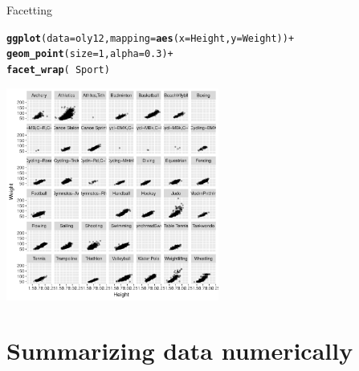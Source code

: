 \documentclass[10pt]{beamer}\usepackage[]{graphicx}\usepackage[]{color}
\makeatletter
\newcommand{\hlnum}[1]{\textcolor[rgb]{0.686,0.059,0.569}{#1}}%
\newcommand{\hlopt}[1]{\textcolor[rgb]{0,0,0}{#1}}%
\newcommand{\hlstd}[1]{\textcolor[rgb]{0.345,0.345,0.345}{#1}}%
\newcommand{\hlkwc}[1]{\textcolor[rgb]{0.333,0.667,0.333}{#1}}%
\newcommand{\hlkwd}[1]{\textcolor[rgb]{0.737,0.353,0.396}{\textbf{#1}}}%
\newenvironment{kframe}{%
 \def\at@end@of@kframe{}%
 \ifinner\ifhmode%
  \def\at@end@of@kframe{\end{minipage}}%
  \begin{minipage}{\columnwidth}%
 \fi\fi%
 \def\FrameCommand##1{\hskip\@totalleftmargin \hskip-\fboxsep
 \colorbox{shadecolor}{##1}\hskip-\fboxsep
     \hskip-\linewidth \hskip-\@totalleftmargin \hskip\columnwidth}%
 \MakeFramed {\advance\hsize-\width
   \@totalleftmargin\z@ \linewidth\hsize
   \@setminipage}}%
 {\par\unskip\endMakeFramed%
 \at@end@of@kframe}
\newenvironment{knitrout}{}{} %
\makeatother
\begin{document}
\begin{frame}[fragile]{Facetting}

\begin{knitrout}\scriptsize
{}\color{fgcolor}\begin{kframe}
\begin{alltt}
\hlkwd{ggplot}\hlstd{(}\hlkwc{data} \hlstd{= oly12,} \hlkwc{mapping} \hlstd{=} \hlkwd{aes}\hlstd{(}\hlkwc{x} \hlstd{= Height,} \hlkwc{y} \hlstd{= Weight))} \hlopt{+}
  \hlkwd{geom_point}\hlstd{(}\hlkwc{size} \hlstd{=} \hlnum{1}\hlstd{,} \hlkwc{alpha} \hlstd{=} \hlnum{0.3}\hlstd{)} \hlopt{+}
  \hlkwd{facet_wrap}\hlstd{(}\hlopt{~} \hlstd{Sport)}
\end{alltt}
\end{kframe}
\includegraphics[width=2.75in,height=2.75in]{figure/unnamed-chunk-12-1} 

\end{knitrout}

\end{frame}


\section{Summarizing data numerically}
\end{document}
